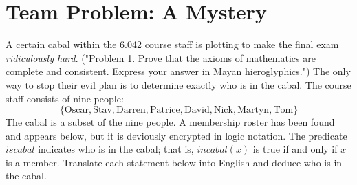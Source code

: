 \documentclass[a4paper]{article}
\begin{document}
\section{Team Problem: A Mystery}
A certain cabal within the 6.042 course staff is plotting to make the final
exam \emph{ridiculously hard}. ("Problem 1.  Prove that the axioms of
mathematics are complete and consistent. Express your answer in Mayan
hieroglyphics.") The only way to stop their evil plan is to determine exactly
who is in the cabal. The course staff consists of nine people:
\begin{equation*} \lbrace \text{Oscar}, \text{Stav}, \text{Darren},
\text{Patrice}, \text{David}, \text{Nick}, \text{Martyn}, \text{Tom} \rbrace
\end{equation*}
The cabal is a subset of the nine people. A membership roster has been found and appears
below, but it is deviously encrypted in logic notation. The predicate $iscabal$ indicates who is
in the cabal; that is, $incabal(x)$ is true if and only if $x$ is a member. Translate each statement
below into English and deduce who is in the cabal.
\end{document}

